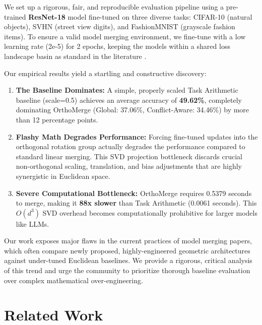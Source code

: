 \documentclass{article}
\begin{document}
We set up a rigorous, fair, and reproducible evaluation pipeline using a pre-trained \textbf{ResNet-18} model fine-tuned on three diverse tasks: CIFAR-10 (natural objects), SVHN (street view digits), and FashionMNIST (grayscale fashion items). To ensure a valid model merging environment, we fine-tune with a low learning rate (2e-5) for 2 epochs, keeping the models within a shared loss landscape basin as standard in the literature \cite{marczak2025isotropic}.

Our empirical results yield a startling and constructive discovery:
\begin{enumerate}
    \item \textbf{The Baseline Dominates:} A simple, properly scaled Task Arithmetic baseline (scale=0.5) achieves an average accuracy of \textbf{49.62\%}, completely dominating OrthoMerge (Global: 37.06\%, Conflict-Aware: 34.46\%) by more than 12 percentage points.
    \item \textbf{Flashy Math Degrades Performance:} Forcing fine-tuned updates into the orthogonal rotation group actually degrades the performance compared to standard linear merging. This SVD projection bottleneck discards crucial non-orthogonal scaling, translation, and bias adjustments that are highly synergistic in Euclidean space.
    \item \textbf{Severe Computational Bottleneck:} OrthoMerge requires 0.5379 seconds to merge, making it \textbf{88x slower} than Task Arithmetic (0.0061 seconds). This $O(d^3)$ SVD overhead becomes computationally prohibitive for larger models like LLMs.
\end{enumerate}

Our work exposes major flaws in the current practices of model merging papers, which often compare newly proposed, highly-engineered geometric architectures against under-tuned Euclidean baselines. We provide a rigorous, critical analysis of this trend and urge the community to prioritize thorough baseline evaluation over complex mathematical over-engineering.

\section{Related Work}
\label{related_work}
\end{document}
